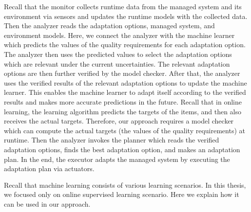 \documentclass[a4paper,12pt]{article}
\begin{document}
Recall that the monitor collects runtime data from the managed system and its environment via sensors and updates the runtime models with the collected data. Then the analyzer reads the adaptation options, managed system, and environment models. Here, we connect the analyzer with the machine learner which predicts the values of the quality requirements for each adaptation option. The analyzer then uses the predicted values to select the adaptation options which are relevant under the current uncertainties. The relevant adaptation options are then further verified by the model checker. After that, the analyzer uses the verified results of the relevant adaptation options to update the machine learner. This enables the machine learner to adapt itself according to the verified results and makes more accurate predictions in the future. Recall that in online learning, the learning algorithm predicts the targets of the items, and then also receives the actual targets. Therefore, our approach requires a model checker which can compute the actual targets (the values of the quality requirements) at runtime. Then the analyzer invokes the planner which reads the verified adaptation options, finds the best adaptation option, and makes an adaptation plan. In the end, the executor adapts the managed system by executing the adaptation plan via actuators.

Recall that machine learning consists of various learning scenarios. In this thesis, we focused only on online supervised learning scenario. Here we explain how it can be used in our approach.
\end{document}

